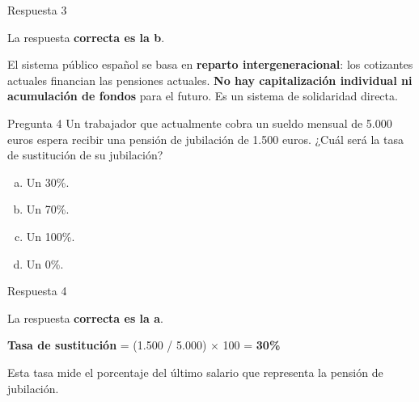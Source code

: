 \documentclass[
  ignorenonframetext,
  aspectratio=54,
  spanish,
]{beamer}
\providecommand{\tightlist}{%
  \setlength{\itemsep}{0pt}\setlength{\parskip}{0pt}}
\begin{document}
\begin{frame}{Respuesta 3}
\label{respuesta-3}
\begin{tcolorbox}[enhanced jigsaw, rightrule=.15mm, colback=white, arc=.35mm, colframe=quarto-callout-tip-color-frame, leftrule=.75mm, bottomrule=.15mm, left=2mm, toprule=.15mm, opacityback=0, breakable]
\begin{minipage}[t]{5.5mm}
\textcolor{quarto-callout-tip-color}{\faLightbulb}
\end{minipage}%
\begin{minipage}[t]{\textwidth - 5.5mm}

La respuesta \textbf{correcta es la b}.

El sistema público español se basa en \textbf{reparto
intergeneracional}: los cotizantes actuales financian las pensiones
actuales. \textbf{No hay capitalización individual ni acumulación de
fondos} para el futuro. Es un sistema de solidaridad directa.

\end{minipage}%
\end{tcolorbox}
\end{frame}

\begin{frame}{Pregunta 4}
\label{pregunta-4}
Un trabajador que actualmente cobra un sueldo mensual de 5.000 euros
espera recibir una pensión de jubilación de 1.500 euros. ¿Cuál será la
tasa de sustitución de su jubilación?

\begin{enumerate}
[a.]
\tightlist
\item
  Un 30\%.
\item
  Un 70\%.
\item
  Un 100\%.
\item
  Un 0\%.
\end{enumerate}
\end{frame}

\begin{frame}{Respuesta 4}
\label{respuesta-4}
\begin{tcolorbox}[enhanced jigsaw, rightrule=.15mm, colback=white, arc=.35mm, colframe=quarto-callout-tip-color-frame, leftrule=.75mm, bottomrule=.15mm, left=2mm, toprule=.15mm, opacityback=0, breakable]
\begin{minipage}[t]{5.5mm}
\textcolor{quarto-callout-tip-color}{\faLightbulb}
\end{minipage}%
\begin{minipage}[t]{\textwidth - 5.5mm}

La respuesta \textbf{correcta es la a}.

\textbf{Tasa de sustitución} = (1.500 / 5.000) × 100 = \textbf{30\%}

Esta tasa mide el porcentaje del último salario que representa la
pensión de jubilación.

\end{minipage}%
\end{tcolorbox}
\end{frame}
\end{document}
